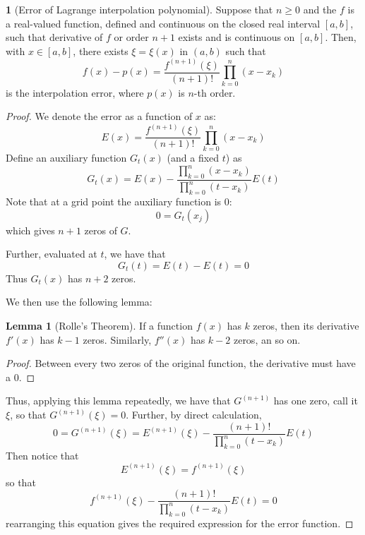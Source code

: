 \documentclass[12pt]{article}
\theoremstyle{definition}
\newtheorem{theorem}{\color{ForestGreen}{\textbf{Theorem}}}
\newtheorem{lemma}{Lemma}
\theoremstyle{definition}
\begin{document}
\begin{theorem}[Error of Lagrange interpolation polynomial]
	Suppose that $n\geq 0$ and the $f$ is a real-valued function, defined and continuous on the closed real interval $[a,b]$, such that derivative of $f$ or order $n+1$ exists and is continuous on $[a,b]$. Then, with $x \in [a,b]$, there exists $\xi = \xi(x)$ in $(a,b)$ such that
	\begin{equation}
		f(x) - p(x) = \frac{f^{(n+1)}(\xi)}{(n+1)!} \prod_{k=0}^n (x-x_k)
	\end{equation}
	is the interpolation error, where $p(x)$ is $n$-th order. 
\end{theorem}
\begin{proof}
We denote the error as a function of $x$ as:
\begin{equation}
	E(x) = \frac{f^{(n+1)}(\xi)}{(n+1)!} \prod_{k=0}^n (x-x_k)
\end{equation}
Define an auxiliary function $G_t(x)$ (and a fixed $t$) as 
\begin{equation}
	G_t(x) = E(x) - \frac{\prod_{k=0}^n (x-x_k)}{\prod_{k=0}^n (t-x_k)}E(t)
\end{equation}
Note that at a grid point the auxiliary function is $0$:
\begin{equation}
	0 = G_t(x_j) 
\end{equation}
which gives $n+1$ zeros of $G$.

Further, evaluated at $t$, we have that
\begin{equation}
	G_t(t) = E(t) - E(t) = 0
\end{equation}
Thus $G_t(x)$ has $n+2$ zeros.

We then use the following lemma:
\begin{lemma}[Rolle's Theorem]
	If a function $f(x)$ has $k$ zeros, then its derivative $f'(x)$ has $k-1$ zeros. Similarly, $f''(x)$ has $k-2$ zeros, an so on.
\end{lemma}
\begin{proof}
	Between every two zeros of the original function, the derivative must have a $0$.
\end{proof}

Thus, applying this lemma repeatedly, we have that $G^{(n+1)}$ has one zero, call it $\xi$, so that $G^{(n+1)}(\xi) = 0$. Further, by direct calculation,
\begin{equation}
	0 = G^{(n+1)}(\xi) = E^{(n+1)}(\xi) - \frac{(n+1)!}{\prod_{k=0}^n (t-x_k)}E(t)
\end{equation}
Then notice that 
\begin{equation}
	E^{(n+1)}(\xi) = f^{(n+1)}(\xi)
\end{equation}
so that
\begin{equation}
	f^{(n+1)}(\xi) - \frac{(n+1)!}{\prod_{k=0}^n (t-x_k)}E(t) = 0
\end{equation}
rearranging this equation gives the required expression for the error function.
\end{proof}
\end{document}
